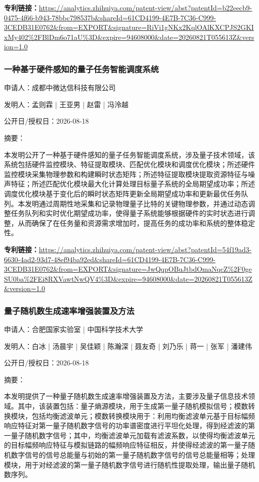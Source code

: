 \documentclass[12pt,a4paper]{ctexart}
\begin{document}
\noindent\textbf{专利链接：}\url{https://analytics.zhihuiya.com/patent-view/abst?patentId=b22eecb9-0475-4f66-b943-78bbc798537b&shareId=61CD4199-4E7B-7C36-C999-3CEDB31E0762&from=EXPORT&signature=RiVi1gNKx2KqlOAlKXCPJS2GKIxMy402%2FBlDm6o71aU%3D&expire=94608000&date=20260821T055613Z&version=1.0}

\subsubsection{ 一种基于硬件感知的量子任务智能调度系统 }

申请人：成都中微达信科技有限公司

发明人：孟则霖 | 王亚男 | 赵雷 | 冯泠越

公开日/授权日：2026-08-18

摘要：

本发明公开了一种基于硬件感知的量子任务智能调度系统，涉及量子技术领域，该系统包括硬件监控模块、特征提取模块、匹配优化模块和调度优化模块；所述硬件监控模块采集物理参数和构建瞬时状态矩阵；所述特征提取模块提取资源特征与噪声特征；所述匹配优化模块最大化计算处理目标量子系统的全局期望成功率；所述调度优化模块基于变化后的瞬时状态矩阵更新全局期望成功率和更新最优任务队列。本发明通过周期性地采集和记录物理量子比特的关键物理参数，并通过动态调整任务队列和实时优化期望成功率，使得量子系统能够根据硬件的实时状态进行调整，从而确保了在任务量和资源需求增加时，提高任务的成功率和系统的整体稳定性。

\noindent\textbf{专利链接：}\url{https://analytics.zhihuiya.com/patent-view/abst?patentId=54f19ad3-6630-4ad2-93d7-48ef94ba92ed&shareId=61CD4199-4E7B-7C36-C999-3CEDB31E0762&from=EXPORT&signature=JwQqpOBuJtbdOmaNqcZ%2F0geSU0ba%2FEi8RXVawtNwQV4%3D&expire=94608000&date=20260821T055613Z&version=1.0}

\subsubsection{ 量子随机数生成速率增强装置及方法 }

申请人：合肥国家实验室 | 中国科学技术大学

发明人：白冰 | 汤晨宇 | 吴佳颖 | 陈瀚深 | 聂友奇 | 刘乃乐 | 蒋一 | 张军 | 潘建伟

公开日/授权日：2026-08-18

摘要：

本发明提供了一种量子随机数生成速率增强装置及方法，主要涉及量子信息技术领域。其中，该装置包括：量子熵源模块，用于生成第一量子随机模拟信号；模数转换模块，包括均衡滤波单元；模数转换模块用于：利用均衡滤波单元基于目标幅频响应特征对第一量子随机数字信号的功率谱密度进行平坦化处理，得到经滤波的第一量子随机数字信号；其中，均衡滤波单元加载有滤波系数，以使得均衡滤波单元的目标幅频响应特征与模拟链路的幅频响应特征相反，并使得经滤波的第一量子随机数字信号的信号总能量与初始的第一量子随机数字信号的信号总能量相等；处理模块，用于对经滤波的第一量子随机数字信号进行随机性提取处理，输出量子随机数序列。
\end{document}
